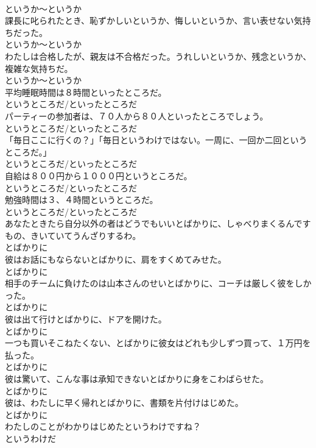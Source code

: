 \documentclass[8pt]{extreport}
\begin{document}
\begin{CJK}{UTF8}{min}
\\	というか～というか	
\\	課長に叱られたとき、恥ずかしいというか、悔しいというか、言い表せない気持ちだった。	
\\	というか～というか	
\\	わたしは合格したが、親友は不合格だった。うれしいというか、残念というか、複雑な気持ちだ。	
\\	というか～というか	
\\	平均睡眠時間は８時間といったところだ。	
\\	というところだ/といったところだ	
\\	パーティーの参加者は、７０人から８０人といったところでしょう。	
\\	というところだ/といったところだ	
\\	「毎日ここに行くの？」「毎日というわけではない。一周に、一回か二回というところだ。」	
\\	というところだ/といったところだ	
\\	自給は８００円から１０００円というところだ。	
\\	というところだ/といったところだ	
\\	勉強時間は３、４時間というところだ。	
\\	というところだ/といったところだ	
\\	あなたときたら自分以外の者はどうでもいいとばかりに、しゃべりまくるんですもの、きいていてうんざりするわ。	
\\	とばかりに	
\\	彼はお話にもならないとばかりに、肩をすくめてみせた。	
\\	とばかりに	
\\	相手のチームに負けたのは山本さんのせいとばかりに、コーチは厳しく彼をしかった。	
\\	とばかりに	
\\	彼は出て行けとばかりに、ドアを開けた。	
\\	とばかりに	
\\	一つも買いそこねたくない、とばかりに彼女はどれも少しずつ買って、１万円を払った。	
\\	とばかりに	
\\	彼は驚いて、こんな事は承知できないとばかりに身をこわばらせた。	
\\	とばかりに	
\\	彼は、わたしに早く帰れとばかりに、書類を片付けはじめた。	
\\	とばかりに	
\\	わたしのことがわかりはじめたというわけですね？	
\\	というわけだ	

\end{CJK}
\end{document}
